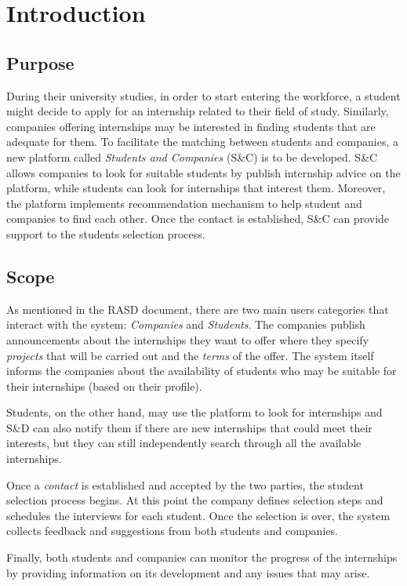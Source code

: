 \chapter{Introduction}
	\section{Purpose}
		During their university studies, in order to start entering the workforce, a student might decide to apply for an internship related to their field of study. Similarly, companies offering internships may be interested in finding students that are adequate for them. To facilitate the matching between students and companies, a new platform called \emph{Students and Companies} (S\&C) is to be developed. S\&C allows companies to look for suitable students by publish internship advice on the platform, while students can look for internships that interest them. Moreover, the platform implements recommendation mechanism to help student and companies to find each other. Once the contact is established, S\&C can provide support to the students selection process.
	\section{Scope}
		As mentioned in the RASD document, there are two main users categories that interact with the system: \emph{Companies} and \emph{Students}. The companies publish announcements about the internships they want to offer where they specify \emph{projects} that will be carried out and the \emph{terms} of the offer. The system itself informs the companies about the availability of students who may be suitable for their internships (based on their profile).
		
		Students, on the other hand, may use the platform to look for internships and S\&D can also notify them if there are new internships that could meet their interests, but they can still independently search through all the available internships.
		
		Once a \emph{contact} is established and accepted by the two parties, the student selection process begins. At this point the company defines selection steps and schedules the interviews for each student. Once the selection is over, the system collects feedback and suggestions from both students and companies.
		
		Finally, both students and companies can monitor the progress of the internships by providing information on its development and any issues that may arise.
		
